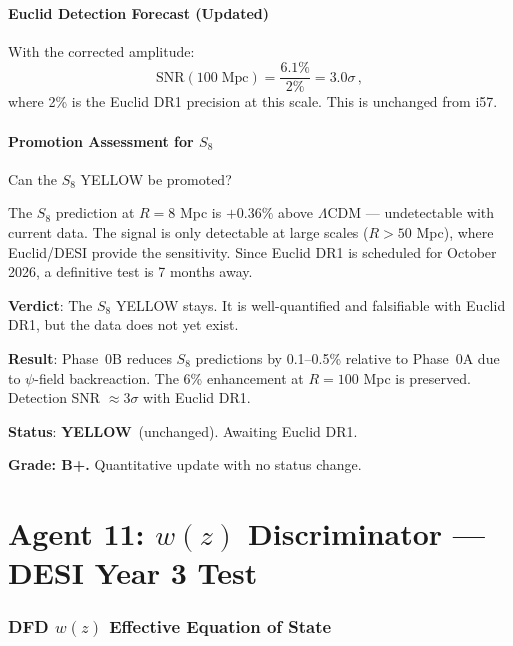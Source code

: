\documentclass[11pt,a4paper]{article}
\newcommand{\YELLOW}{\textcolor{dfdyellow}{\textbf{YELLOW}}}
\begin{document}
\subsection{Euclid Detection Forecast (Updated)}

With the corrected amplitude:
\begin{equation}
\mathrm{SNR}(100\;\mathrm{Mpc}) = \frac{6.1\%}{2\%} = 3.0\sigma\,,
\end{equation}
where 2\% is the Euclid DR1 precision at this scale. This is unchanged from i57.

\subsection{Promotion Assessment for $S_8$}

Can the $S_8$ YELLOW be promoted?

The $S_8$ prediction at $R = 8$ Mpc is $+0.36\%$ above $\Lambda$CDM --- undetectable with current data. The signal is only detectable at large scales ($R > 50$ Mpc), where Euclid/DESI provide the sensitivity. Since Euclid DR1 is scheduled for October 2026, a definitive test is 7 months away.

\textbf{Verdict}: The $S_8$ YELLOW stays. It is well-quantified and falsifiable with Euclid DR1, but the data does not yet exist.

\begin{tcolorbox}[colback=yellow!5!white, colframe=yellow!60!black, title={Agent 10: $S_8$ Phase 0B Update --- YELLOW (Quantified, Awaiting Euclid)}]
\textbf{Result}: Phase~0B reduces $S_8$ predictions by 0.1--0.5\% relative to Phase~0A due to $\psi$-field backreaction. The 6\% enhancement at $R = 100$ Mpc is preserved. Detection SNR $\approx 3\sigma$ with Euclid DR1.

\textbf{Status}: \YELLOW\ (unchanged). Awaiting Euclid DR1.

\textbf{Grade: B+.} Quantitative update with no status change.
\end{tcolorbox}


\part{Agent 11: $w(z)$ Discriminator --- DESI Year 3 Test}
\label{part:wz}

\section{DFD $w(z)$ Effective Equation of State}
\end{document}

